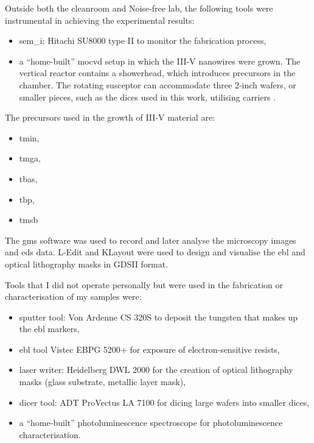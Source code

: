 Outside both the cleanroom and Noise-free lab, the following tools were instrumental in achieving the experimental results:
\begin{itemize}
    \item \acf{sem_i}: Hitachi SU8000 type II to monitor the fabrication process,
    \item a “home-built” \acf{mocvd} setup in which the III-V nanowires were grown. The vertical reactor contains a showerhead, which introduces precursors in the chamber. The rotating susceptor can accommodate three 2-inch wafers, or smaller pieces, such as the  dices used in this work, utilising carriers \cite{Brugnolotto2023}.
\end{itemize}
\par
The precursors used in the growth of III-V material are:
\begin{itemize}
    \item \acf{tmin},
    \item \acf{tmga},
    \item \acf{tbas},
    \item \acf{tbp},
    \item \acf{tmsb}
\end{itemize}

The \acf{gms} software was used to record and later analyse the microscopy images and \acs{eds} data. L-Edit and KLayout were used to design and visualise the \acf{ebl} and optical lithography masks in GDSII format. 
\par 
Tools that I did not operate personally but were used in the fabrication or characterisation of my samples were:
\begin{itemize}
    \item sputter tool: Von Ardenne CS 320S to deposit the tungsten that makes up the \acl{ebl} markers,
    \item \acl{ebl} tool Vistec EBPG 5200+ for exposure of electron-sensitive resists,
    \item laser writer: Heidelberg DWL 2000 for the creation of optical lithography masks (glass substrate, metallic layer mask),
    \item dicer tool: ADT ProVectus LA 7100 for dicing large wafers into smaller dices,
    \item a “home-built” photoluminescence spectroscope for photoluminescence characterisation.
\end{itemize}
